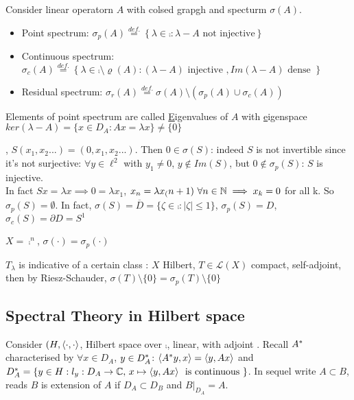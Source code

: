 \begin{definition}\nl
    Consider linear operatorn $A$ with colsed grapgh and specturm $\sigma(A)$.
    \begin{itemize}
        \item Point spectrum: $\sigma_p(A)\stackrel{def.}{=}
        \left\{
        \lambda\in \comp :\lambda-A \text{ not  injective}
        \right\}$
        \item Continuous spectrum: $\sigma_c(A)\stackrel{def.}{=}
        \left\{
        \lambda\in\comp\setminus\varrho(A):(\lambda-A) \text{ injective }, Im(\lambda-A) \text{ dense }        
        \right\}$
        \item Residual spectrum:  $\sigma_r(A)\stackrel{def.}{=}\sigma(A)\setminus(
        \sigma_p(A)\cup\sigma_c(A))$ 
        \end{itemize}
        Elements of point spectrum are called {\underline Eigenvalues of $A$} with {\underline eigenspace} $ker(\lambda-A)=\{x\in D_A:Ax=\lambda x\}\neq\{0\}$
    
\end{definition}

\begin{example}\nl
    , $S(x_1,x_2...)=(0,x_1,x_2...)$. Then $0\in\sigma(S)$: indeed $S$ is not invertible since it's not surjective: $\forall y\in\ell^2$ with $y_1\neq0$, $ y\notin Im(S)$, but $0\notin\sigma_p(S)$: $S$ is injective.\\
    In fact $Sx=\lambda x\implies0=\lambda x_1$, $x_n=\lambda x_(n+1)\,\,\forall n\in\mathbb{N}\implies x_k=0$ for all k. So $\sigma_p(S)=\emptyset$. In fact, $\sigma(S)=\overline{D}=\{\zeta\in\comp:|\zeta|\leq1\}$, $\sigma_p(S)=D$, $\sigma_c(S)=\partial D=S^1$
\end{example} 
\begin{example}\nl
    $X=\comp^n$, $\sigma(\cdot)=\sigma_p(\cdot)$
\end{example}
\begin{example}\nl
    $T_\lambda$ is indicative of a certain class : $ X$ Hilbert, $T\in\mathcal{L}(X)$ compact, self-adjoint, then by Riesz-Schauder, $\sigma(T)\setminus\{0\}=\sigma_p(T)\setminus\{0\}
    $
\end {example}


\subsection{Spectral Theory in Hilbert space}
Consider $(H,\left<{\cdot},{\cdot}\right>$, Hilbert space over $\comp$,  linear, with adjoint . Recall ${A}^*$ characterised by $\forall x\in D_A$, $y\in D_{A}^*$: $\left<{{A}^*y},{x}\right>=\left<{y},{Ax}\right>$ and $D_{A}^*=\{y\in H : l_y:D_A\to \mathbb{C},\,x\mapsto \left<{y},{Ax}\right>\,\text{ is continuous }\}$.
In sequel write $A\subset B$, reads $B$ is extension of $A$ if $D_A\subset D_B$ and $B|_{D_A}=A$.


